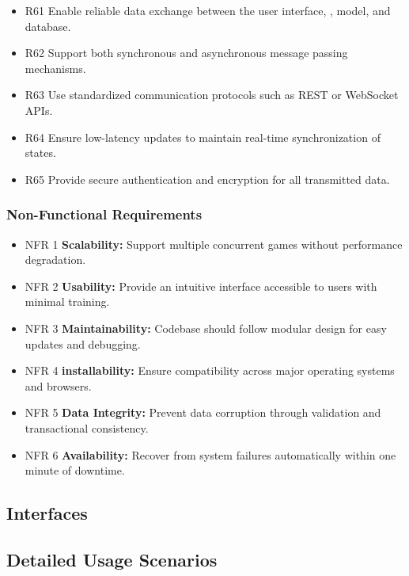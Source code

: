 \documentclass{article}
\begin{document}
\begin{itemize}
  \item R61 Enable reliable data exchange between the user interface, \DigitalTwin{},
        \AI{} model, and database.
  \item R62 Support both synchronous and asynchronous message passing mechanisms.
  \item R63 Use standardized communication protocols such as REST or WebSocket APIs.
  \item R64 Ensure low-latency updates to maintain real-time synchronization of states.
  \item R65 Provide secure authentication and encryption for all transmitted data.

\end{itemize}

\subsubsection{Non-Functional Requirements}

\begin{itemize}
  \item NFR 1 \textbf{Scalability:} Support multiple concurrent games without
        performance degradation.
  \item NFR 2 \textbf{Usability:} Provide an intuitive interface accessible to users
        with minimal training.
  \item NFR 3 \textbf{Maintainability:} Codebase should follow modular design for easy
        updates and debugging.
  \item NFR 4 \textbf{installability:} Ensure compatibility across major operating systems
        and browsers.
  \item NFR 5 \textbf{Data Integrity:} Prevent data corruption through validation and
        transactional consistency.
  \item NFR 6 \textbf{Availability:} Recover from system failures automatically within
        one minute of downtime.
\end{itemize}


\subsection{Interfaces}\label{subsec:interfaces}
\subsection{Detailed Usage Scenarios}\label{subsec:detailed-usage-scenarios}
\end{document}
